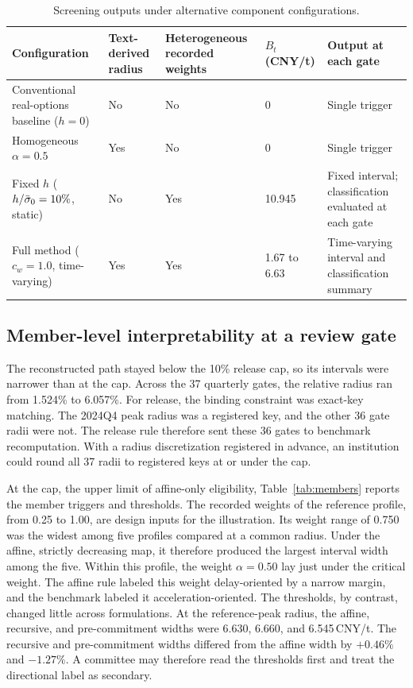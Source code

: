 \begin{table}[!t]
\caption{Screening outputs under alternative component configurations.}
\label{tab:components}
\centering
\footnotesize
\begin{tabular}{@{}L{0.27\textwidth}L{0.11\textwidth}L{0.15\textwidth}L{0.1\textwidth}L{0.25\textwidth}@{}}
\toprule
Configuration & Text-derived radius & Heterogeneous recorded weights & $B_t$ (CNY/t) & Output at each gate\\
\midrule
Conventional real-options baseline ($h=0$) & No & No & 0 & Single trigger\\
Homogeneous $\alpha=0.5$ & Yes & No & 0 & Single trigger\\
Fixed $h$ ($h/\bar{\sigma}_0=10\%$, static) & No & Yes & 10.945 & Fixed interval; classification evaluated at each gate\\
Full method ($c_w=1.0$, time-varying) & Yes & Yes & 1.67 to 6.63 & Time-varying interval and classification summary\\
\bottomrule
\end{tabular}
\end{table}

\subsection{Member-level interpretability at a review gate}

The reconstructed path stayed below the 10\% release cap, so its intervals were narrower than at the cap. Across the 37 quarterly gates, the relative radius ran from 1.524\% to 6.057\%. For release, the binding constraint was exact-key matching. The 2024Q4 peak radius was a registered key, and the other 36 gate radii were not. The release rule therefore sent these 36 gates to benchmark recomputation. With a radius discretization registered in advance, an institution could round all 37 radii to registered keys at or under the cap. 

At the cap, the upper limit of affine-only eligibility, Table~\ref{tab:members} reports the member triggers and thresholds. The recorded weights of the reference profile, from 0.25 to 1.00, are design inputs for the illustration. Its weight range of 0.750 was the widest among five profiles compared at a common radius. Under the affine, strictly decreasing map, it therefore produced the largest interval width among the five. Within this profile, the weight $\alpha=0.50$ lay just under the critical weight. The affine rule labeled this weight delay-oriented by a narrow margin, and the benchmark labeled it acceleration-oriented. The thresholds, by contrast, changed little across formulations. At the reference-peak radius, the affine, recursive, and pre-commitment widths were 6.630, 6.660, and 6.545\,CNY/t. The recursive and pre-commitment widths differed from the affine width by $+0.46\%$ and $-1.27\%$. A committee may therefore read the thresholds first and treat the directional label as secondary.


